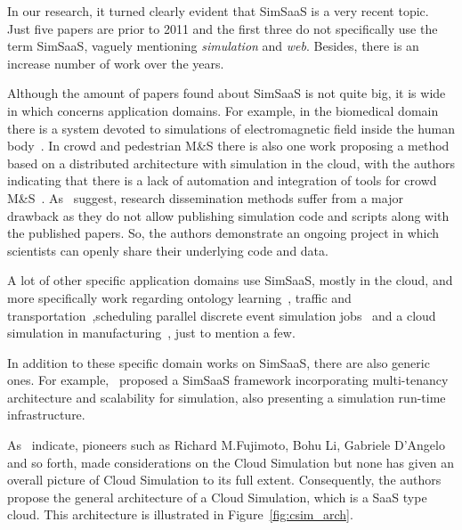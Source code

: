 \documentclass[conference]{IEEEtran}
\begin{document}
In our research, it turned clearly evident that SimSaaS is a very recent topic. Just five papers are prior to 2011 and the first three do not specifically use the term SimSaaS, vaguely mentioning \textit{simulation} and \textit{web}. Besides, there is an increase number of work over the years.

Although the amount of papers found about SimSaaS is not quite big, it is wide in which concerns application domains. For example, in the biomedical domain there is a system devoted to simulations of electromagnetic field inside the human body~\cite{Sawicki20121190}. In crowd and pedestrian M\&S there is also one work proposing a method based on a distributed architecture with simulation in the cloud, with the authors indicating that there is a lack of automation and integration of tools for crowd M\&S~\cite{Wang:2015:SSM:2723553.2723554}. As~\cite{Sliman2013611} suggest, research dissemination methods suffer from a major drawback as they do not allow publishing simulation code and scripts along with the published papers. So, the authors demonstrate an ongoing project in which scientists can openly share their underlying code and data.

A lot of other specific application domains use SimSaaS, mostly in the cloud, and more specifically work regarding ontology learning~\cite{Wang2014179}, traffic and transportation~\cite{Harri2010},scheduling parallel discrete event simulation jobs~\cite{Liu2012} and a cloud simulation in manufacturing~\cite{Taylor201489}, just to mention a few.

In addition to these specific domain works on SimSaaS, there are also generic ones. For example,~\cite{Tsai:2011:SSS:2048370.2048381} proposed a SimSaaS framework incorporating multi-tenancy architecture and scalability for simulation, also presenting a simulation run-time infrastructure.

As~\cite{Liu201271} indicate, pioneers such as Richard M.Fujimoto, Bohu Li, Gabriele D'Angelo and so forth, made considerations on the Cloud Simulation but none has given an overall picture of Cloud Simulation to its full extent. Consequently, the authors propose the general architecture of a Cloud Simulation, which is a SaaS type cloud. This architecture is illustrated in Figure~\ref{fig:csim_arch}.
\end{document}
